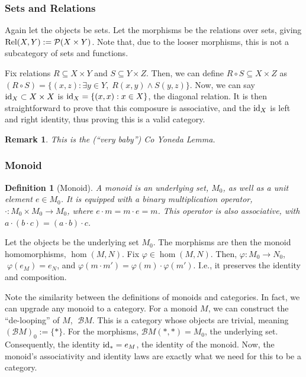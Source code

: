 \documentclass[12pt]{article}
\newtheorem{remark}[theorem]{Remark}
\newtheorem{definition}{Definition}
\begin{document}
\subsubsection{Sets and Relations}
Again let the objects be sets. Let the morphisms be the relations over sets, giving $\textmd{Rel}(X,Y) := \mathcal{P}(X \times Y)$. Note that, due to the looser morphisms, this is not a subcategory of sets and functions.

Fix relations $R \subseteq X \times Y$ and $S \subseteq Y \times Z$. Then, we can define $R \circ S \subseteq X \times Z$ as $(R \circ S) = \{(x,z): \exists y \in Y, \; R(x,y) \land S(y,z)\}$. Now, we can say $\textmd{id}_X \subset X \times X$ is $\textmd{id}_X = \{(x,x):x \in X\}$, the diagonal relation. It is then straightforward to prove that this composure is associative, and the $\textmd{id}_X$ is left and right identity, thus proving this is a valid category.

\begin{remark}
    This is the (``very baby'') Co Yoneda Lemma.
\end{remark}

\subsubsection{Monoid}
\begin{definition}[Monoid]
    A monoid is an underlying set, $M_0$, as well as a unit element $e \in M_0$. It is equipped with a binary multiplication operator, $\cdot: M_0 \times M_0 \rightarrow M_0$, where $e\cdot m = m \cdot e = m$. This operator is also associative, with $a \cdot (b \cdot c) = (a \cdot b) \cdot c$.
\end{definition}

Let the objects be the underlying set $M_0$. The morphisms are then the monoid homomorphisms, $\hom(M, N)$. Fix $\varphi \in \hom(M,N)$. Then, $\varphi:M_0 \rightarrow N_0$, $\; \varphi(e_M) = e_N$, and $\varphi(m \cdot m') = \varphi(m) \cdot \varphi(m')$. I.e., it preserves the identity and composition.

\vspace{5mm}

Note the similarity between the definitions of monoids and categories. In fact, we can upgrade any monoid to a category. For a monoid $M$, we can construct the ``de-looping'' of $M$, $\;\mathcal{B}M$. This is a category whose objects are trivial, meaning $(\mathcal{B}M)_0 := \{ \ast\}$. For the morphisms, $\mathcal{B}M(\ast, \ast) = M_0$, the underlying set. Consequently, the identity $\textmd{id}_\ast = e_M$, the identity of the monoid. Now, the monoid's associativity and identity laws are exactly what we need for this to be a category.
\end{document}
